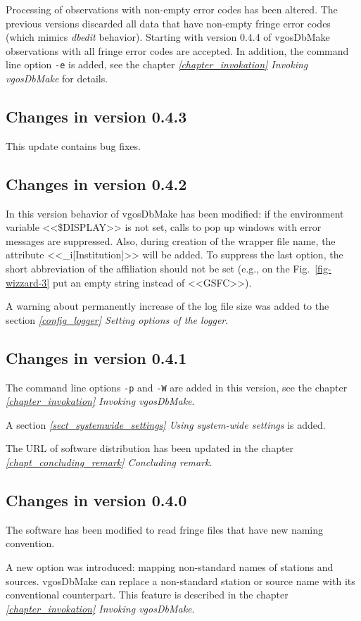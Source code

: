 \documentclass [10pt,letterpaper]{report}
\begin{document}
Processing of observations with non-empty error codes has been altered. The previous
versions discarded all data that have non-empty fringe error codes (which mimics
{\it dbedit} behavior). Starting with version 0.4.4 of vgosDbMake observations with
all fringe error codes are accepted. In addition, the command line option {\tt -e} is
added, see
the chapter \emph{\ref{chapter_invokation} Invoking vgosDbMake} for details.

\subsection{Changes in version 0.4.3}
This update contains bug fixes.

\subsection{Changes in version 0.4.2}
In this version behavior of vgosDbMake has been modified: if the environment
variable <<\$DISPLAY>> is not set, calls to pop up windows with error messages are
suppressed. Also, during creation of the wrapper file name, the attribute
<<\_i[Institution]>> will be added. To suppress the last option, the short
abbreviation of the affiliation should not be set (e.g., on the Fig.~\ref{fig-wizzard-3}
put an empty string instead of <<GSFC>>).

A warning about permanently increase of the log file size was added to the section
\emph{\ref{config_logger} Setting options of the logger}.


\subsection{Changes in version 0.4.1}
The command line options {\tt -p} and {\tt -W} are added in this version, see
the chapter \emph{\ref{chapter_invokation} Invoking vgosDbMake}.

A section \emph{\ref{sect_systemwide_settings} Using system-wide settings} is added.

The URL of software distribution has been updated in the chapter
\emph{\ref{chapt_concluding_remark} Concluding remark}.


\subsection{Changes in version 0.4.0}
The software has been modified to read fringe files that have new naming convention.

A new option was introduced: mapping non-standard names of stations and sources.
vgosDbMake can replace a non-standard station or source name with its conventional
counterpart. This feature is described in the chapter \emph{\ref{chapter_invokation}
Invoking vgosDbMake}.
\end{document}
